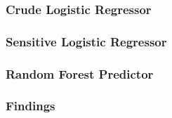 \documentclass{beamer}
\begin{document}
\begin{frame}
          \frametitle{Crude Logistic Regressor}

\end{frame}

\begin{frame}
          \frametitle{Sensitive Logistic Regressor}

\end{frame}

\begin{frame}
          \frametitle{Random Forest Predictor}

\end{frame}


\begin{frame}
          \frametitle{Findings}

\end{frame}
\end{document}
